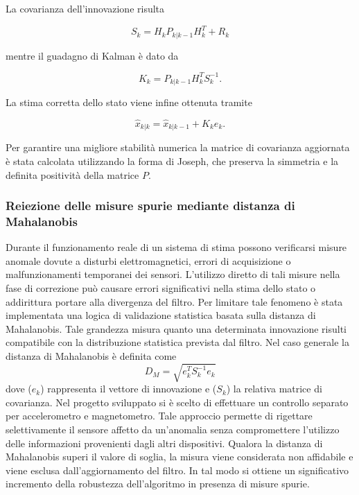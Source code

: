 \documentclass[12pt,a4paper]{article}
\begin{document}
La covarianza dell'innovazione risulta

\begin{equation}
S_k = H_k P_{k|k-1} H_k^T + R_k
\end{equation}

mentre il guadagno di Kalman è dato da

\begin{equation}
K_k = P_{k|k-1} H_k^T S_k^{-1}.
\end{equation}

La stima corretta dello stato viene infine ottenuta tramite

\begin{equation}
\hat{x}_{k|k} = \hat{x}_{k|k-1} + K_k e_k.
\end{equation}

Per garantire una migliore stabilità numerica la matrice di covarianza aggiornata è stata calcolata utilizzando la forma di Joseph,
che preserva la simmetria e la definita positività della matrice $P$.

\subsubsection{Reiezione delle misure spurie mediante distanza di Mahalanobis}
Durante il funzionamento reale di un sistema di stima possono verificarsi misure anomale dovute a disturbi elettromagnetici, errori di acquisizione o malfunzionamenti temporanei dei sensori. L'utilizzo diretto di tali misure nella fase di correzione può causare errori significativi nella stima dello stato o addirittura portare alla divergenza del filtro.
Per limitare tale fenomeno è stata implementata una logica di validazione statistica basata sulla distanza di Mahalanobis. Tale grandezza misura quanto una determinata innovazione risulti compatibile con la distribuzione statistica prevista dal filtro.
Nel caso generale la distanza di Mahalanobis è definita come
\begin{equation}
D_M=
\sqrt{
e_k^TS_k^{-1}e_k
}
\end{equation}
dove ($e_k$) rappresenta il vettore di innovazione e ($S_k$) la relativa matrice di covarianza.
Nel progetto sviluppato si è scelto di effettuare un controllo separato per accelerometro e magnetometro. Tale approccio permette di rigettare selettivamente il sensore affetto da un'anomalia senza compromettere l'utilizzo delle informazioni provenienti dagli altri dispositivi.
Qualora la distanza di Mahalanobis superi il valore di soglia, la misura viene considerata non affidabile e viene esclusa dall'aggiornamento del filtro. In tal modo si ottiene un significativo incremento della robustezza dell'algoritmo in presenza di misure spurie.
\end{document}
